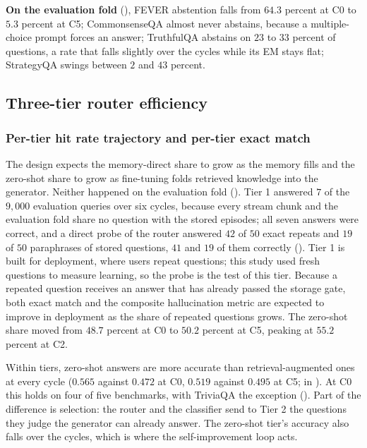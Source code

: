 \textbf{On the evaluation fold} (), FEVER abstention falls from $64.3$ percent at C0 to $5.3$ percent at C5; CommonsenseQA almost never abstains, because a multiple-choice prompt forces an answer; TruthfulQA abstains on $23$ to $33$ percent of questions, a rate that falls slightly over the cycles while its EM stays flat; StrategyQA swings between $2$ and $43$ percent.

\FloatBarrier

\subsection{Three-tier router efficiency}
\label{sec:tier-efficiency}

\subsubsection{Per-tier hit rate trajectory and per-tier exact match}
\label{sec:tier-hit}

The design expects the memory-direct share to grow as the memory fills and the zero-shot share to grow as fine-tuning folds retrieved knowledge into the generator. Neither happened on the evaluation fold (). Tier 1 answered $7$ of the $9{,}000$ evaluation queries over six cycles, because every stream chunk and the evaluation fold share no question with the stored episodes; all seven answers were correct, and a direct probe of the router answered $42$ of $50$ exact repeats and $19$ of $50$ paraphrases of stored questions, $41$ and $19$ of them correctly (). Tier 1 is built for deployment, where users repeat questions; this study used fresh questions to measure learning, so the probe is the test of this tier. Because a repeated question receives an answer that has already passed the storage gate, both exact match and the composite hallucination metric are expected to improve in deployment as the share of repeated questions grows. The zero-shot share moved from $48.7$ percent at C0 to $50.2$ percent at C5, peaking at $55.2$ percent at C2.

Within tiers, zero-shot answers are more accurate than retrieval-augmented ones at every cycle ($0.565$ against $0.472$ at C0, $0.519$ against $0.495$ at C5;  in ). At C0 this holds on four of five benchmarks, with TriviaQA the exception (). Part of the difference is selection: the router and the classifier send to Tier 2 the questions they judge the generator can already answer. The zero-shot tier's accuracy also falls over the cycles, which is where the self-improvement loop acts.

